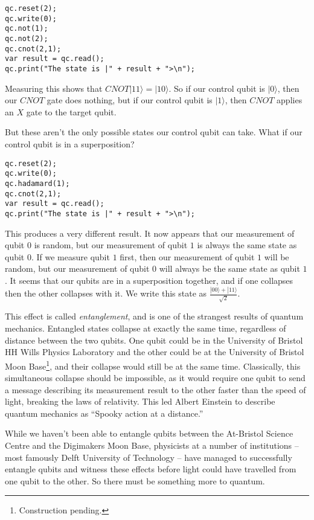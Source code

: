 \documentclass[twocolumn]{article}
\begin{document}
\begin{lstlisting}
qc.reset(2);
qc.write(0);
qc.not(1);
qc.not(2);
qc.cnot(2,1);
var result = qc.read();
qc.print("The state is |" + result + ">\n");
\end{lstlisting}

Measuring this shows that $CNOT|11\rangle = |10\rangle$. So if our control qubit is $|0\rangle$, then our $CNOT$ gate does nothing, but if our control qubit is $|1\rangle$, then $CNOT$ applies an $X$ gate to the target qubit.

But these aren't the only possible states our control qubit can take. What if our control qubit is in a superposition?

\begin{lstlisting}
qc.reset(2);
qc.write(0);
qc.hadamard(1);
qc.cnot(2,1);
var result = qc.read();
qc.print("The state is |" + result + ">\n");
\end{lstlisting}

This produces a very different result. It now appears that our measurement of qubit $0$ is random, but our measurement of qubit $1$ is always the same state as qubit $0$. If we measure qubit $1$ first, then our measurement of qubit $1$ will be random, but our measurement of qubit $0$ will always be the same state as qubit $1$. It seems that our qubits are in a superposition together, and if one collapses then the other collapses with it. We write this state as $\frac{|00\rangle + |11\rangle}{\sqrt{2}}$.

This effect is called {\em entanglement}, and is one of the strangest results of quantum mechanics. Entangled states collapse at exactly the same time, regardless of distance between the two qubits. One qubit could be in the University of Bristol HH Wills Physics Laboratory and the other could be at the University of Bristol Moon Base\footnote{Construction pending.}, and their collapse would still be at the same time. Classically, this simultaneous collapse should be impossible, as it would require one qubit to send a message describing its measurement result to the other faster than the speed of light, breaking the laws of relativity. This led Albert Einstein to describe quantum mechanics as ``Spooky action at a distance.''

While we haven't been able to entangle qubits between the At-Bristol Science Centre and the Digimakers Moon Base, physicists at a number of institutions -- most famously Delft University of Technology -- have managed to successfully entangle qubits and witness these effects before light could have travelled from one qubit to the other. So there must be something more to quantum.
\end{document}
